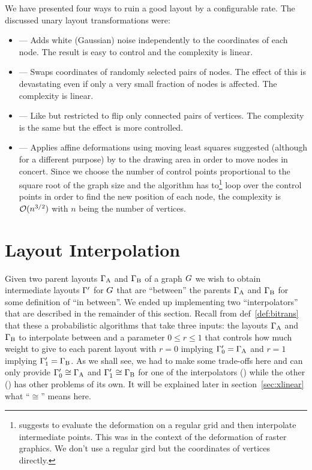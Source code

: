 \documentclass{graphstudy}
\begin{document}
We have presented four ways to ruin a good layout by a configurable rate.  The discussed unary layout transformations
were:

\begin{itemize}
\item{} --- Adds white (Gaussian) noise independently to the coordinates of each node.  The result is easy
  to control and the complexity is linear.
\item{} --- Swaps coordinates of randomly selected pairs of nodes.  The effect of this is devastating
  even if only a very small fraction of nodes is affected.  The complexity is linear.
\item{} --- Like  but restricted to flip only connected pairs of vertices.  The
  complexity is the same but the effect is more controlled.
\item{} --- Applies affine deformations using moving least squares suggested (although for a different
  purpose) by \textcite{Schaefer2006} to the drawing area in order to move nodes in concert.  Since we choose the number
  of control points proportional to the square root of the graph size and the algorithm has to\footnote{%
    \citeauthor{Schaefer2006} suggests to evaluate the deformation on a regular grid and then interpolate intermediate
    points.  This was in the context of the deformation of raster graphics.  We don't use a regular gird but the
    coordinates of vertices directly.
  }
  loop over the control points in order to find the new position of each node, the complexity is \(\operatorname{\mathcal{O}}(n^{3/2})\) with
  \(n\) being the number of vertices.
\end{itemize}

\section{Layout Interpolation}
\label{sec:lay-inter}

Given two parent layouts \(\Gamma_\mathrm{A}\) and \(\Gamma_\mathrm{B}\) of a graph \(G\) we wish to obtain
intermediate layouts \(\Gamma'\) for \(G\) that are \enquote{between} the parents \(\Gamma_\mathrm{A}\) and
\(\Gamma_\mathrm{B}\) for some definition of \enquote{in between}.  We ended up implementing two
\enquote{interpolators} that are described in the remainder of this section.  Recall from \acl{def}~\ref{def:bitrans}
that these a probabilistic algorithms that take three inputs: the layouts \(\Gamma_\mathrm{A}\) and
\(\Gamma_\mathrm{B}\) to interpolate between and a parameter \(0\leq{r}\leq1\) that controls how much weight to give to
each parent layout with \(r=0\) implying \(\Gamma_0'=\Gamma_\mathrm{A}\) and \(r=1\) implying
\(\Gamma_1'=\Gamma_\mathrm{B}\).  As we shall see, we had to make some trade-offs here and can only provide
\(\Gamma_0'\cong\Gamma_\mathrm{A}\) and \(\Gamma_1'\cong\Gamma_\mathrm{B}\) for one of the interpolators
() while the other () has other problems of its own.  It will be explained later in
\acl{section}~\ref{sec:xlinear} what \enquote{\(\cong\)} means here.
\end{document}
